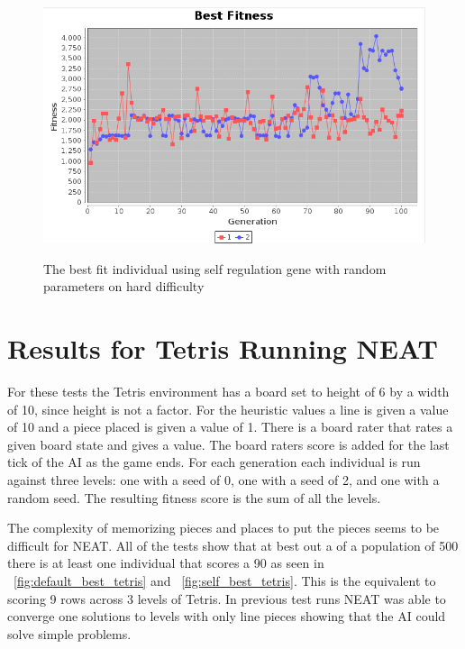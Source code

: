 \documentclass[12pt]{ucthesis} \newif\ifpdf \ifx\pdfoutput\undefined
\begin{document}
\begin{figure}[h!]
  \caption{The best fit individual using self regulation gene with random
  parameters on hard difficulty}
  \centering
    \includegraphics[width=1\textwidth]{graphsone/selfreg_random_best.png}
   \label{fig:selfreg_random_hard_best} 
\end{figure}


\section{Results for Tetris Running NEAT}
For these tests the Tetris environment has a board set to height of 6 by a width
of 10, since height is not a factor. For the heuristic values a line is given a
value of 10 and a piece placed is given a value of 1. There is a board rater
that rates a given board state and gives a value. The board raters score is
added for the last tick of the AI as the game ends. For each generation each
individual is run against three levels: one with a seed of 0, one with a seed of
2, and one with a random seed. The resulting fitness score is the sum of all the
levels.

The complexity of memorizing pieces and places to put the pieces seems to be
difficult for NEAT. All of the tests show that at best out a of a population of
500 there is at least one individual that scores a 90 as seen in
~\ref{fig:default_best_tetris} and ~\ref{fig:self_best_tetris}. This is the 
equivalent to scoring 9 rows across 3 levels of Tetris. In previous test runs
NEAT was able to converge one solutions to levels with only line pieces showing
that the AI could solve simple problems.
\end{document}
